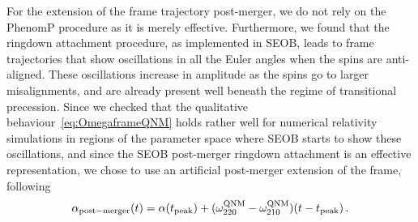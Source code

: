 \documentclass[aps,showpacs,twocolumn,
prd,superscriptaddress,nofootinbib]{revtex4-1}
\newcommand{\be}{\begin{equation}}
\newcommand{\ee}{\end{equation}}
\begin{document}
For the extension of the frame trajectory post-merger, we do not rely on the PhenomP procedure as it is merely effective. Furthermore, we found that the ringdown attachment procedure, as implemented in SEOB, leads to frame trajectories that show oscillations in all the Euler angles when the spins are anti-aligned. These oscillations increase in amplitude as the spins go to larger misalignments, and are already present well beneath the regime of transitional precession. Since we checked that the qualitative behaviour~\eqref{eq:OmegaframeQNM} holds rather well for numerical relativity simulations in regions of the parameter space where SEOB starts to show these oscillations, and since the SEOB post-merger ringdown attachment is an effective representation, we chose to use an artificial post-merger extension of the frame, following
\be\label{eq:alphaQNM}
	\alpha_{\rm post-merger}(t) = \alpha(t_{\rm peak}) + (\omega_{220}^{\rm QNM} - \omega_{210}^{\rm QNM})(t-t_{\rm peak}) \,.
\ee
\end{document}
